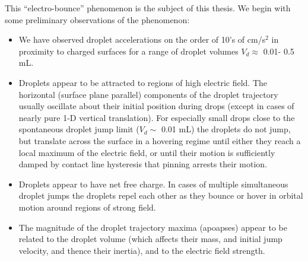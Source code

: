 \documentclass[12pt,a4paper,oneside]{book}
\begin{document}
This ``electro-bounce'' phenomenon is the subject of this thesis. We begin with some preliminary observations of the phenomenon:
\begin{itemize}
\item We have observed droplet accelerations on the order of 10's of cm/s$^2$ in proximity to charged surfaces for a range of droplet volumes $V_d \approx$ 0.01- 0.5 mL.
\item Droplets appear to be attracted to regions of high electric field. The horizontal (surface plane parallel) components of the droplet trajectory usually oscillate about their initial position during drops (except in cases of nearly pure 1-D vertical translation). For especially small drops close to the spontaneous droplet jump limit ($V_d \sim$ 0.01 mL) the droplets do not jump, but translate across the surface in a hovering regime until either they reach a local maximum of the electric field, or until their motion is sufficiently damped by contact line hysteresis that pinning arrests their motion.
\item Droplets appear to have net free charge. In cases of multiple simultaneous droplet jumps the droplets repel each other as they bounce or hover in orbital motion around regions of strong field.
\item The magnitude of the droplet trajectory maxima (apoapses) appear to be related to the droplet volume (which affects their mass, and initial jump velocity, and thence their inertia), and to the electric field strength.
\end{itemize}
\end{document}
